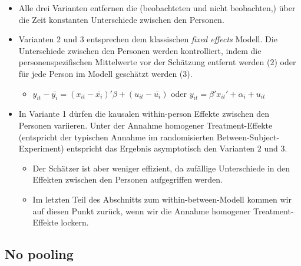 \documentclass[
]{book}
\providecommand{\tightlist}{%
  \setlength{\itemsep}{0pt}\setlength{\parskip}{0pt}}
\begin{document}
\begin{itemize}
\tightlist
\item
  Alle drei Varianten entfernen die (beobachteten und nicht beobachten,) über die Zeit konstanten Unterschiede zwischen den Personen.
\item
  Varianten 2 und 3 entsprechen dem klassischen \emph{fixed effects} Modell. Die Unterschiede zwischen den Personen werden kontrolliert, indem die personenspezifischen Mittelwerte vor der Schätzung entfernt werden (2) oder für jede Person im Modell geschätzt werden (3).

  \begin{itemize}
  \tightlist
  \item
    \(y_{it}-\bar{y_{i}} = (x_{it} - \bar{x_{i}})'\beta + (u_{it} - \bar{u_{i}})\) oder \(y_{it} = \beta' x_{it}' + \alpha_i + u_{it}\)
  \end{itemize}
\item
  In Variante 1 dürfen die kausalen within-person Effekte zwischen den Personen variieren. Unter der Annahme homogener Treatment-Effekte (entspricht der typischen Annahme im randomisierten Between-Subject-Experiment) entspricht das Ergebnis asymptotisch den Varianten 2 und 3.

  \begin{itemize}
  \tightlist
  \item
    Der Schätzer ist aber weniger effizient, da zufällige Unterschiede in den Effekten zwischen den Personen aufgegriffen werden.
  \item
    Im letzten Teil des Abschnitts zum within-between-Modell kommen wir auf diesen Punkt zurück, wenn wir die Annahme homogener Treatment-Effekte lockern.
  \end{itemize}
\end{itemize}

\hypertarget{no-pooling}{%
\subsection*{No pooling}\label{no-pooling}}
\end{document}
